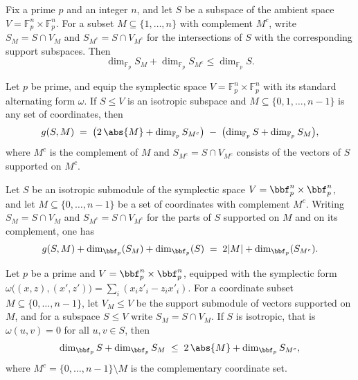 \begin{lemma}
\label{dim_S_M_add_dim_S_M_c_le_dim_S}
\leanok
{}
Fix a prime $p$ and an integer $n$, and let $S$ be a subspace of the ambient space $V =
\mathbb{F}_p^n \times \mathbb{F}_p^n$. For a subset $M \subseteq \{1,\dots,n\}$ with
complement $M^c$, write $S_M = S \cap V_M$ and $S_{M^c} = S \cap V_{M^c}$ for the
intersections of $S$ with the corresponding support subspaces. Then
\[
  \dim_{\mathbb{F}_p} S_M + \dim_{\mathbb{F}_p} S_{M^c} \le \dim_{\mathbb{F}_p} S.
\]
\end{lemma}

\begin{lemma}
\label{g_formula}
\leanok
{}
Let $p$ be prime, and equip the symplectic space $V = \mathbb{F}_p^n \times
\mathbb{F}_p^n$ with its standard alternating form $\omega$. If $S \le V$ is an
isotropic subspace and $M \subseteq \{0,1,\dots,n-1\}$ is any set of coordinates, then
\[
g(S,M) \;=\; \bigl(2\,\abs{M} + \dim_{\mathbb{F}_p} S_{M^c}\bigr) \;-\;
\bigl(\dim_{\mathbb{F}_p} S + \dim_{\mathbb{F}_p} S_M\bigr),
\]
where $M^c$ is the complement of $M$ and $S_{M^c} = S \cap V_{M^c}$ consists of the
vectors of $S$ supported on $M^c$.
\end{lemma}

\begin{lemma}
\label{g_add_dims}
\leanok
{}
Let $S$ be an isotropic submodule of the symplectic space $V=\bbf_p^n\times\bbf_p^n$,
and let $M\subseteq\{0,\dots,n-1\}$ be a set of coordinates with complement $M^c$.
Writing $S_M=S\cap V_M$ and $S_{M^c}=S\cap V_{M^c}$ for the parts of $S$ supported on
$M$ and on its complement, one has
\[
g(S,M)+\dim_{\bbf_p}(S_M)+\dim_{\bbf_p}(S) \;=\; 2\lvert M\rvert +
\dim_{\bbf_p}(S_{M^c}).
\]
\end{lemma}

\begin{lemma}
\label{dim_ineq_aux}
\leanok
{}
Let $p$ be a prime and $V = \bbf_p^n \times \bbf_p^n$, equipped with the symplectic form
$\omega\big((x,z),(x',z')\big) = \sum_{i} (x_i z'_i - z_i x'_i)$. For a coordinate
subset $M \subseteq \{0,\dots,n-1\}$, let $V_M \le V$ be the support submodule of
vectors supported on $M$, and for a subspace $S \le V$ write $S_M = S \cap V_M$. If $S$
is isotropic, that is $\omega(u,v) = 0$ for all $u,v \in S$, then \[ \dim_{\bbf_p} S +
\dim_{\bbf_p} S_M \;\le\; 2\,\abs{M} + \dim_{\bbf_p} S_{M^c}, \] where $M^c =
\{0,\dots,n-1\} \setminus M$ is the complementary coordinate set.
\end{lemma}

